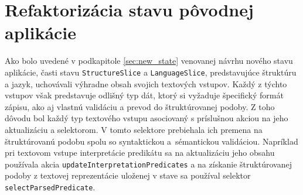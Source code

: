 %
%
%


\section{Refaktorizácia stavu pôvodnej aplikácie}
Ako bolo uvedené v podkapitole \ref{sec:new_state} venovanej návrhu nového stavu aplikácie, časti stavu \texttt{StructureSlice} a \texttt{LanguageSlice}, predstavujúce štruktúru a jazyk, uchovávali výhradne obsah svojich textových vstupov. Každý z týchto vstupov však predstavuje odlišný typ dát, ktorý si vyžaduje špecifický formát zápisu, ako aj vlastnú validáciu a prevod do štruktúrovanej podoby. Z toho dôvodu bol každý typ textového vstupu asociovaný s príslušnou akciou na jeho aktualizáciu a selektorom. V tomto selektore prebiehala ich premena na štruktúrovanú podobu spolu so syntaktickou a~sémantickou validáciou. Napríklad pri textovom vstupe interpretácie predikátu sa na aktualizáciu jeho obsahu používala akcia \texttt{updateInterpretationPredicates} a na získanie štruktúrovanej podoby z textovej reprezentácie uloženej v stave sa používal selektor \texttt{selectParsedPredicate}. 

